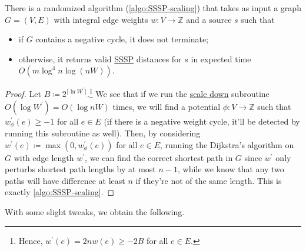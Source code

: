 \begin{theorem}\label{thm:SSSP}
	There is a randomized algorithm (\autoref{algo:SSSP-scaling}) that takes as input a graph \(G = (V, E)\) with integral edge weights \(w \colon V \to \mathbb{Z} \) and a source \(s\) such that
	\begin{itemize}
		\item if \(G\) contains a negative cycle, it does not terminate;
		\item otherwise, it returns valid \hyperref[prb:SSSP]{SSSP} distances for \(s\) in expected time \(O(m \log ^4 n \log (nW))\).
	\end{itemize}
\end{theorem}
\begin{proof}
	Let \(B \coloneqq 2^{\lceil \ln W^{\prime} \rceil }\).\footnote{Hence, \(w^{\prime} (e) = 2n w(e) \geq -2B\) for all \(e \in E\).} We see that if we run the \hyperref[thm:SSSP-scale-down]{scale down} subroutine \(O(\log W^{\prime} ) = O(\log nW)\) times, we will find a potential \(\phi \colon V \to \mathbb{Z} \) such that \(w^{\prime} _{\phi } (e) \geq -1 \) for all \(e \in E\) (if there is a negative weight cycle, it'll be detected by running this subroutine as well). Then, by considering \(w^{\prime} (e) \coloneqq \max (0, w^{\prime} _\phi (e))\) for all \(e \in E\), running the Dijkstra's algorithm on \(G\) with edge length \(w^{\prime}\), we can find the correct shortest path in \(G\) since \(w^{\prime} \) only perturbs shortest path lengths by at most \(n-1\), while we know that any two paths will have difference at least \(n\) if they're not of the same length. This is exactly \autoref{algo:SSSP-scaling}.
\end{proof}

With some slight tweaks, we obtain the following.

